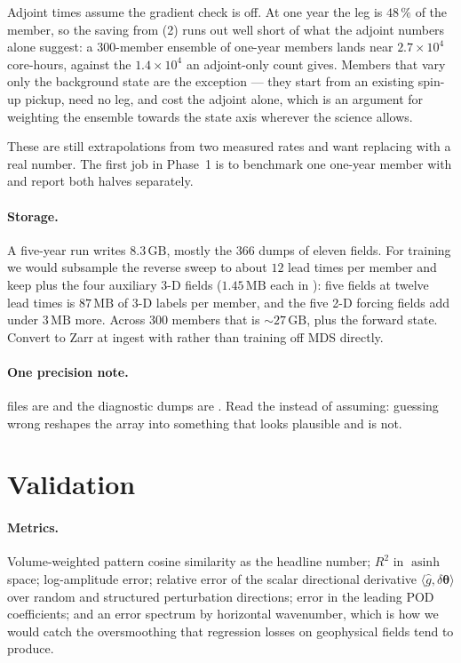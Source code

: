 Adjoint times assume the gradient check is off. At one year the leg is $48\,\%$
of the member, so the saving from (2) runs out well short of what the adjoint
numbers alone suggest: a 300-member ensemble of one-year members lands near
$2.7\times10^{4}$ core-hours, against the $1.4\times10^{4}$ an adjoint-only count
gives. Members that vary only the background state are the exception --- they
start from an existing spin-up pickup, need no leg, and cost the adjoint alone,
which is an argument for weighting the ensemble towards the state axis wherever
the science allows.

These are still extrapolations from two measured rates and want replacing with a
real number. The first job in Phase~1 is to benchmark one one-year member with
 and report both halves separately.

\paragraph{Storage.}
A five-year run writes $8.3\,\mathrm{GB}$, mostly the $366$ dumps of eleven
fields. For training we would subsample the reverse sweep to about $12$ lead
times per member and keep  plus the four auxiliary 3-D fields
($1.45\,\mathrm{MB}$ each in ): five fields at twelve lead times
is $87\,\mathrm{MB}$ of 3-D labels per member, and the five 2-D forcing fields
add under $3\,\mathrm{MB}$ more. Across $300$ members that is
$\sim\!27\,\mathrm{GB}$, plus the forward state. Convert to Zarr at ingest with  rather than
training off MDS directly.

\paragraph{One precision note.}  files are  and the
 diagnostic dumps are . Read the  instead
of assuming: guessing wrong reshapes the array into something that looks
plausible and is not.

\section{Validation}
\label{sec:val}

\paragraph{Metrics.} Volume-weighted pattern cosine similarity as the headline
number; $R^{2}$ in $\operatorname{asinh}$ space; log-amplitude error; relative
error of the scalar directional derivative
$\langle\hat{g},\delta\boldsymbol\theta\rangle$ over random and structured
perturbation directions; error in the leading POD coefficients; and an error
spectrum by horizontal wavenumber, which is how we would catch the
oversmoothing that regression losses on geophysical fields tend to produce.

